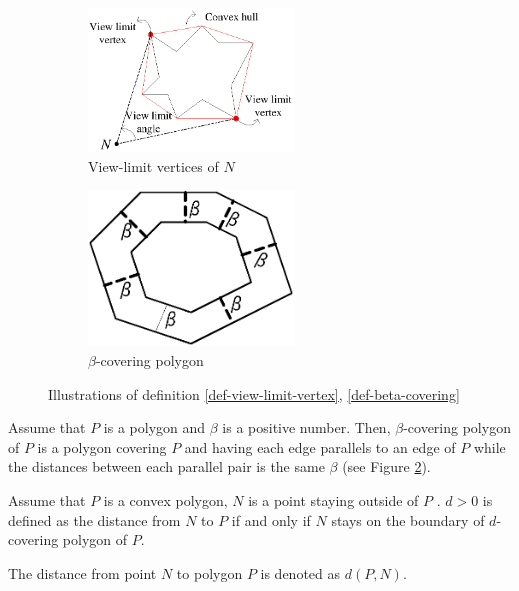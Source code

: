 \begin{figure}[!htb]
\centering
\begin{subfigure}{0.5\textwidth}
  \centering
  \includegraphics[width=0.6\textwidth]{Chapter4/Chapter4Figs/fig-view-limit-vertex.eps}
  \caption{View-limit vertices of $N$}
  \label{fig-def-viewlimit}
\end{subfigure}%
\begin{subfigure}{0.5\textwidth}
  \centering
  \includegraphics[width=0.6\textwidth]{Chapter4/Chapter4Figs/fig-covering-polygon.eps}
  \caption{$\beta$-covering polygon}
  \label{fig-def-betacovering}
\end{subfigure}
\caption{Illustrations of definition \ref{def-view-limit-vertex}, \ref{def-beta-covering}}
\label{fig-beta-covering}
\end{figure}

\begin{mydef}\label{def-beta-covering}
Assume that $P$ is a polygon and $\beta$ is a positive number. Then, $\beta$-covering polygon of $P$ is a polygon covering $P$ and having each edge parallels to an edge of $P$ while the distances between each parallel pair is the same $\beta$ (see Figure \ref{fig-def-betacovering}).
\end{mydef}

\begin{mydef}
Assume that $P$ is a convex polygon, $N$ is a point staying outside of $P$ . $d > 0$ is defined as the distance from $N$ to $P$ if and only if $N$ stays on the boundary of $d$-covering polygon of $P$.
\end{mydef}
The distance from point $N$ to polygon $P$ is denoted as $d(P, N)$.

